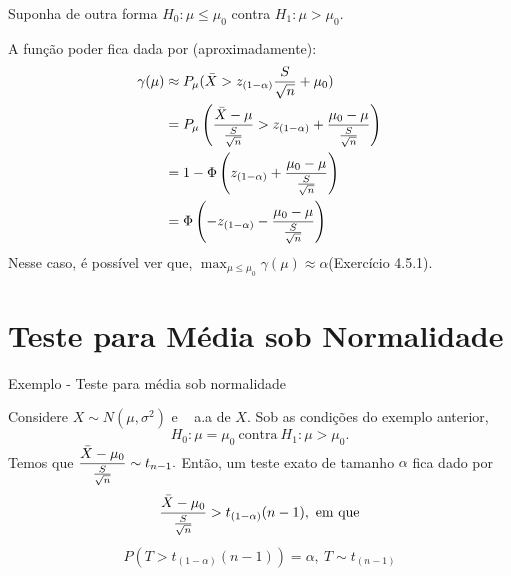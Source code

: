 \documentclass[12pt]{beamer}
\begin{document}
\begin{frame}{}
\vspace{-0.2cm}
\begin{block}{}
\justifying
Suponha de outra forma $H_{0}:\mu\leq \mu_{0}$ contra $H_{1}:\mu>\mu_{0}.$
\end{block}
\pause
\begin{block}{}
\justifying
A função poder fica dada por (aproximadamente):
\begin{align*}
    \gamma(\mu)&\approx P_{\mu}(\Bar{X}>z_{(1-\alpha)}\frac{S}{\sqrt{n}}+\mu_{0})\\
    &=P_{\mu}\left(\dfrac{\Bar{X}-\mu}{\frac{S}{\sqrt{n}}}>z_{(1-\alpha)}+\dfrac{\mu_{0}-\mu}{\frac{S}{\sqrt{n}}}\right)\\
    &=1-\Phi\left(z_{(1-\alpha)}+\dfrac{\mu_{0}-\mu}{\frac{S}{\sqrt{n}}}\right)\\
    &=\Phi\left(-z_{(1-\alpha)}-\dfrac{\mu_{0}-\mu}{\frac{S}{\sqrt{n}}}\right)
\end{align*}
Nesse caso, é possível ver que, \({\displaystyle \max_{\mu\leq\mu_{0}}\gamma(\mu)\approx\alpha}\)(Exercício 4.5.1).
\end{block}
\end{frame}

\section{Teste para Média sob Normalidade}
\begin{frame}{Exemplo - Teste para média sob normalidade}
\begin{block}{}
\justifying
Considere $X\sim N(\mu,\sigma^{2})$ e \seqX~ a.a de $X.$ Sob as condições do exemplo anterior,
\[H_{0}:\mu= \mu_{0}~\text{contra}~H_{1}:\mu>\mu_{0}.\]
Temos que $\dfrac{\Bar{X}-\mu_{0}}{\frac{S}{\sqrt{n}}}\sim t_{n-1}.$ Então, um teste exato de tamanho $\alpha$ fica dado por
\begin{align*}
    \dfrac{\Bar{X}-\mu_{0}}{\frac{S}{\sqrt{n}}}>t_{(1-\alpha)}(n-1),~\text{em que}
\end{align*}
\begin{align*}
    P(T>t_{(1-\alpha)}(n-1))=\alpha,~T\sim t_{(n-1)}
\end{align*}
\end{block}
\end{frame}
\end{document}
